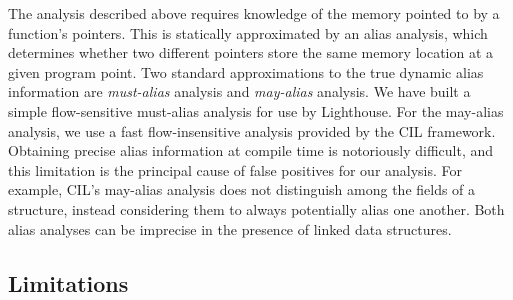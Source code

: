 The analysis described above requires knowledge of the memory pointed to by
a function's pointers.  
%
This is statically approximated by an alias analysis, which determines
whether two different pointers store the same memory location at a given
program point.  
%
Two standard approximations to the true dynamic alias information are {\em
must-alias} analysis and {\em may-alias} analysis.
%
We have built a simple flow-sensitive must-alias analysis for use by
Lighthouse.  
%
For the may-alias analysis, we use a fast flow-insensitive analysis provided
by the CIL framework.  
%
Obtaining precise alias information at compile time is notoriously
difficult, and this limitation is the principal cause of false positives for
our analysis.
%
For example, CIL's may-alias analysis does not distinguish among the fields
of a structure, instead considering them to always potentially alias one
another.  
%
Both alias analyses can be imprecise in the presence of linked data
structures.









\subsection{Limitations}




